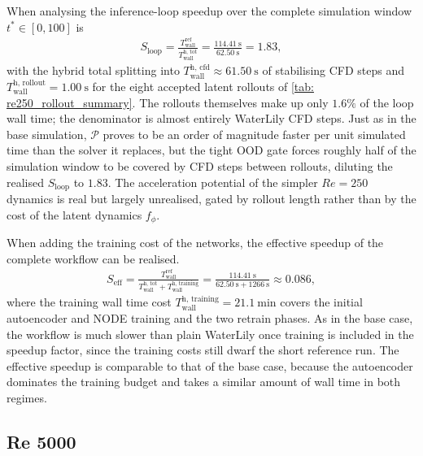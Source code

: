 When analysing the inference-loop speedup over the complete simulation window $t^* \in [0, 100]$ is
%
\begin{align}
  S_\text{loop} = \frac{T_\text{wall}^\text{ref}}{T_\text{wall}^\text{h, tot}}
  = \frac{\SI{114.41}{\second}}{\SI{62.50}{\second}} = 1.83,
\end{align}
%
with the hybrid total splitting into $T_\text{wall}^\text{h, cfd} \approx \SI{61.50}{\second}$ of stabilising CFD steps and $T_\text{wall}^\text{h, rollout} = \SI{1.00}{\second}$ for the eight accepted latent rollouts of \autoref{tab: re250_rollout_summary}. The rollouts themselves make up only $1.6\%$ of the loop wall time; the denominator is almost entirely WaterLily CFD steps. Just as in the base simulation, $\mathcal{P}$ proves to be an order of magnitude faster per unit simulated time than the solver it replaces, but the tight OOD gate forces roughly half of the simulation window to be covered by CFD steps between rollouts, diluting the realised $S_\text{loop}$ to $1.83$. The acceleration potential of the simpler $Re = 250$ dynamics is real but largely unrealised, gated by rollout length rather than by the cost of the latent dynamics $f_\phi$. 

When adding the training cost of the networks, the effective speedup of the complete workflow can be realised.
%
\begin{align}
  S_\text{eff}
  = \frac{T_\text{wall}^\text{ref}}{T_\text{wall}^\text{h, tot} + T_\text{wall}^\text{h, training}}
  = \frac{\SI{114.41}{\second}}{\SI{62.50}{\second} + \SI{1266}{\second}} \approx 0.086,
\end{align}
%
where the training wall time cost $T_\text{wall}^\text{h, training} = \SI{21.1}{\minute}$ covers the initial autoencoder and NODE training and the two retrain phases. As in the base case, the workflow is much slower than plain WaterLily once training is included in the speedup factor, since the training costs still dwarf the short reference run. The effective speedup is comparable to that of the base case, because the autoencoder dominates the training budget and takes a similar amount of wall time in both regimes.


\subsection{Re 5000}
\label{subsect: 4_RE5000}

